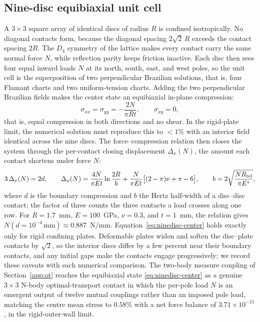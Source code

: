 \documentclass{svjour3}                 %
\begin{document}
\begin{appendix}
\subsection{Nine-disc equibiaxial unit cell}\label{app:ninedisc}

A $3\times3$ square array of identical discs of radius $R$ is confined isotropically. No
diagonal contacts form, because the diagonal spacing $2\sqrt2\,R$ exceeds the contact
spacing $2R$. The $D_4$ symmetry of the lattice makes every contact carry the same normal
force $N$, while reflection parity keeps friction inactive. Each disc then sees four equal
inward loads $N$ at its north, south, east, and west poles, so the unit cell is the
superposition of two perpendicular Brazilian solutions, that is, four Flamant charts and
two uniform-tension charts. Adding the two perpendicular Brazilian fields makes the center
state an equibiaxial in-plane compression:
\begin{equation}\label{eq:ninedisc-center}
  \sigma_{xx} = \sigma_{yy} = -\frac{2N}{\pi R t}, \qquad \sigma_{xy}=0,
\end{equation}
that is, equal compression in both directions and no shear. In the rigid-plate limit, the
numerical solution must reproduce this to $<1\%$ with an interior field identical across
the nine discs. The force--compression relation then closes the system through the
per-contact closing displacement $\Delta_x(N)$, the amount each contact shortens under
force $N$:
\begin{equation}\label{eq:ninedisc-force}
  3\,\Delta_x(N) = 2d, \qquad
  \Delta_x(N) = \frac{4N}{\pi E t}\ln\frac{2R}{b}
  + \frac{N}{\pi E t}\big[(2-\pi)\nu + \pi - 6\big],
  \qquad
  b = 2\sqrt{\frac{N R_{\rm rel}}{\pi E^\ast}},
\end{equation}
where $d$ is the boundary compression and $b$ the Hertz half-width of a disc--disc
contact; the factor of three counts the three contacts a load crosses along one row. For
$R=1.7$~mm, $E=100$~GPa, $\nu=0.3$, and $t=1$~mm, the relation gives
$N(d{=}10^{-4}\,\text{mm}) \approx 0.887$~N/mm. Equation~\eqref{eq:ninedisc-center} holds
exactly only for rigid confining plates. Deformable plates widen and soften the disc--plate
contacts by $\sqrt2$, so the interior discs differ by a few percent near their boundary
contacts, and any initial gaps make the contacts engage progressively; we record these
caveats with each numerical comparison. The two-body measure coupling of Section~\ref{app:ot} reaches the
equibiaxial state \eqref{eq:ninedisc-center} as a genuine $3\times3$ N-body optimal-transport contact in which
the per-pole load $N$ is an emergent output of twelve mutual couplings rather than an imposed pole load, matching
the centre mean stress to $0.58\%$ with a net force balance of $3.71\times10^{-15}$, in the rigid-outer-wall limit.


\end{appendix}
\end{document}
